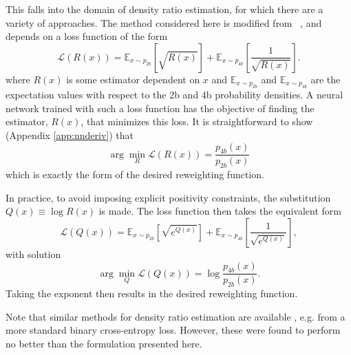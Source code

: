 This falls into the domain of density ratio estimation, for which there are a variety
of approaches. The method considered here is modified from ~\cite{NNloss, NNloss1}, and depends on
a loss function of the form
\begin{equation}
\mathcal{L}(R(x)) = \mathbb{E}_{x\sim p_{2b}}[\sqrt{R(x)}]
+\mathbb{E}_{x\sim p_{4b}}[\frac{1}{\sqrt{R(x)}}].
\end{equation}
where $R(x)$ is some estimator dependent on $x$ and $\mathbb{E}_{x\sim p_{2b}}$ and 
$\mathbb{E}_{x\sim p_{4b}}$ are the expectation values with respect to the 2b and 4b probability 
densities. A neural network trained with such a loss function has the objective of finding
the estimator, $R(x)$, that minimizes this loss. It is straightforward to show
(Appendix \ref{app:nnderiv}) that
\begin{equation}
\arg \min_{R}\mathcal{L}(R(x)) = \frac{p_{4b}(x)}{p_{2b}(x)}
\end{equation}
which is exactly the form of the desired reweighting function.

In practice, to avoid imposing explicit positivity constraints, the substitution
$Q(x) \equiv \log R(x)$ is made. The loss function then takes the equivalent form
\begin{equation}
\mathcal{L}(Q(x)) = \mathbb{E}_{x\sim p_{2b}}[\sqrt{e^{Q(x)}}]
+\mathbb{E}_{x\sim p_{4b}}[\frac{1}{\sqrt{e^{Q(x)}}}],
\end{equation}
with solution
\begin{equation}
\arg \min_{Q}\mathcal{L}(Q(x)) = \log\frac{p_{4b}(x)}{p_{2b}(x)}.
\end{equation}
Taking the exponent then results in the desired reweighting function.

Note that similar methods for density ratio estimation are available ,
e.g. from a more standard binary cross-entropy loss. However, these were found to
perform no better than the formulation presented here.

